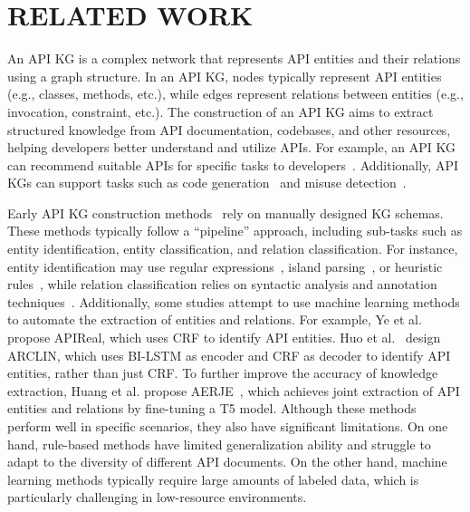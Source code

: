 \section{RELATED WORK}
An API KG is a complex network that represents API entities and their relations using a graph structure.
In an API KG, nodes typically represent API entities (e.g., classes, methods, etc.), while edges represent relations between entities (e.g., invocation, constraint, etc.).
The construction of an API KG aims to extract structured knowledge from API documentation, codebases, and other resources, helping developers better understand and utilize APIs.
For example, an API KG can recommend suitable APIs for specific tasks to developers~\cite{huang2023answering}.
Additionally, API KGs can support tasks such as code generation~\cite{liao20243, liu2023codegen4libs} and misuse detection~\cite{ren2023misuse, Ren2020APIMisuseDD}.



Early API KG construction methods~\cite{Ren2021KGAMDAA, Liu2020GeneratingCB, Li2018ImprovingAC} rely on manually designed KG schemas.
These methods typically follow a ``pipeline'' approach, including sub-tasks such as entity identification, entity classification, and relation classification.
For instance, entity identification may use regular expressions~\cite{bacchelli2010linking}, island parsing~\cite{Treude2016AugmentingAD}, or heuristic rules~\cite{Huang2018APIMR}, while relation classification relies on syntactic analysis and annotation techniques~\cite{Liu2020GeneratingCB, li2018improving}.
Additionally, some studies attempt to use machine learning methods to automate the extraction of entities and relations.
For example, Ye et al.~\cite{crf1} propose APIReal, which uses CRF to identify API entities.
Huo et al.~\cite{lstmcrf} design ARCLIN, which uses BI-LSTM as encoder and CRF as decoder to identify API entities, rather than just CRF.
To further improve the accuracy of knowledge extraction, Huang et al. propose AERJE~\cite{yanbang1}, which achieves joint extraction of API entities and relations by fine-tuning a T5 model.
Although these methods perform well in specific scenarios, they also have significant limitations.
On one hand, rule-based methods have limited generalization ability and struggle to adapt to the diversity of different API documents.
On the other hand, machine learning methods typically require large amounts of labeled data, which is particularly challenging in low-resource environments.


